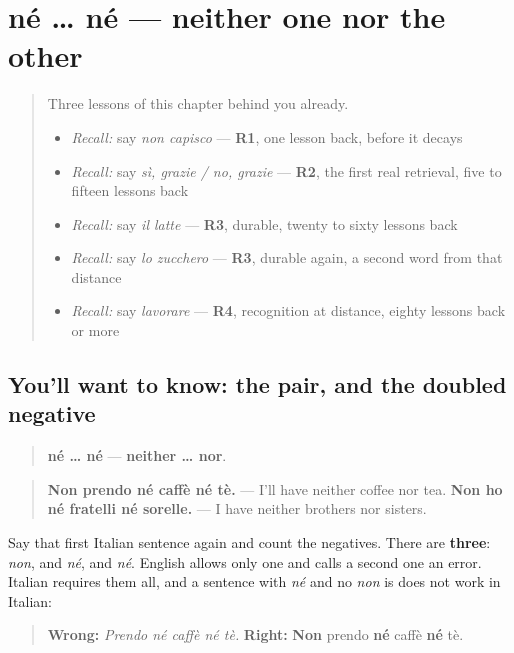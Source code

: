 \section[né … né]{né … né — neither one nor the other}

\label{lesson:IT-C30-ne}



\begin{quote}
Three lessons of this chapter behind you already.

\begin{itemize}
\raggedright
  \item \emph{Recall:} say \emph{non capisco} — \textbf{R1}, one lesson back, before it decays
  \item \emph{Recall:} say \emph{sì, grazie / no, grazie} — \textbf{R2}, the first real retrieval, five to fifteen lessons back
  \item \emph{Recall:} say \emph{il latte} — \textbf{R3}, durable, twenty to sixty lessons back
  \item \emph{Recall:} say \emph{lo zucchero} — \textbf{R3}, durable again, a second word from that distance
  \item \emph{Recall:} say \emph{lavorare} — \textbf{R4}, recognition at distance, eighty lessons back or more
\end{itemize}
\end{quote}

\subsection*{You'll want to know: the pair, and the doubled negative}
\begin{quote}
\textbf{né … né} — \textbf{neither … nor}.
\end{quote}

\begin{quote}
\textbf{Non prendo né caffè né tè.} — I'll have neither coffee nor tea. \textbf{Non ho né fratelli né sorelle.} — I have neither brothers nor sisters.
\end{quote}

Say that first Italian sentence again and count the negatives. There are \textbf{three}: \emph{non}, and \emph{né}, and \emph{né}. English allows only one and calls a second one an error. Italian requires them all, and a sentence with \emph{né} and no \emph{non} is does not work in Italian:

\begin{quote}
\textbf{Wrong:} \emph{Prendo né caffè né tè.} \textbf{Right:} \textbf{Non} prendo \textbf{né} caffè \textbf{né} tè.
\end{quote}

